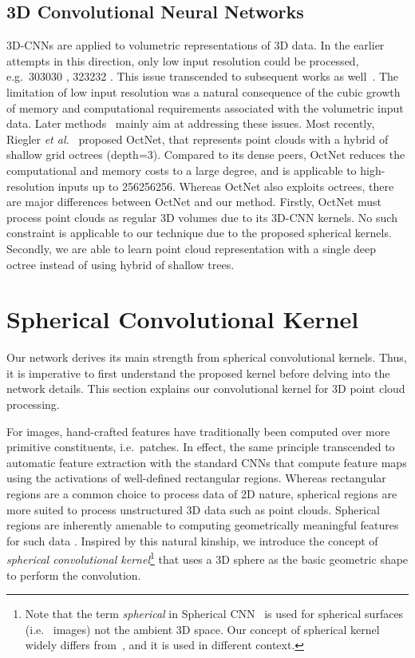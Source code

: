\documentclass[10pt,twocolumn,letterpaper]{article}
\begin{document}
\subsection{3D Convolutional Neural Networks} 
\vspace{-2mm}
3D-CNNs are  applied to volumetric representations of 3D data. 
 In the earlier attempts in this direction, only low input resolution  could be processed, e.g.~303030 \cite{wu20153d}, 323232 \cite{maturana2015voxnet}.
This issue transcended to subsequent works as well~\cite{huang2016point,sedaghat2016orientation,zeng20163dmatch,zhang2017deepcontext}. 
The limitation of low input resolution was a natural consequence of the cubic growth of memory and computational requirements associated with the volumetric input data. 
Later methods~\cite{EngelckeICRA2017,li2016fpnn} mainly aim at addressing these issues. 
Most recently, 
Riegler \emph{et al.}~\cite{riegler2017octnet} proposed OctNet, that represents point clouds with a hybrid of shallow grid octrees (depth=3). Compared to its dense peers, OctNet reduces the computational and memory costs to a large degree, and is applicable to high-resolution inputs up to 256256256. 
Whereas OctNet also exploits octrees, there are major differences between OctNet and our method. 
Firstly, OctNet must process point clouds as regular 3D volumes due to its 3D-CNN kernels. No such constraint is applicable to our technique due to the proposed  spherical kernels. Secondly, we are able to learn point cloud representation with a single deep octree instead of using hybrid of shallow trees. 


\section{Spherical Convolutional Kernel} \label{sec:SC}
\vspace{-1mm}
Our network derives its main strength from spherical convolutional kernels. Thus, it is imperative to first understand the proposed kernel before delving into the network details. This section explains our convolutional kernel for 3D point cloud processing.     

For images, hand-crafted features have traditionally been computed over more primitive constituents, i.e.~patches. In effect, the same principle transcended to automatic feature extraction with the standard CNNs that compute feature maps using the activations of well-defined rectangular regions. Whereas rectangular regions are a common choice to process data of 2D nature, spherical regions are more suited to process unstructured 3D data such as point clouds. Spherical regions are inherently amenable to computing geometrically meaningful features for such data \cite{frome2004recognizing,tombari2010unique,tombari2010uniqueACM}.
Inspired by this natural kinship, we introduce the concept of \textit{spherical convolutional kernel}\footnote{Note that the term \emph{spherical} in Spherical CNN~\cite{cohen2018spherical} is used for spherical surfaces (i.e.~ images) not the ambient 3D space. Our concept of spherical kernel widely differs from~\cite{cohen2018spherical}, and it is used in different context.} that uses a 3D sphere as the basic geometric shape to perform the convolution. 
\end{document}
